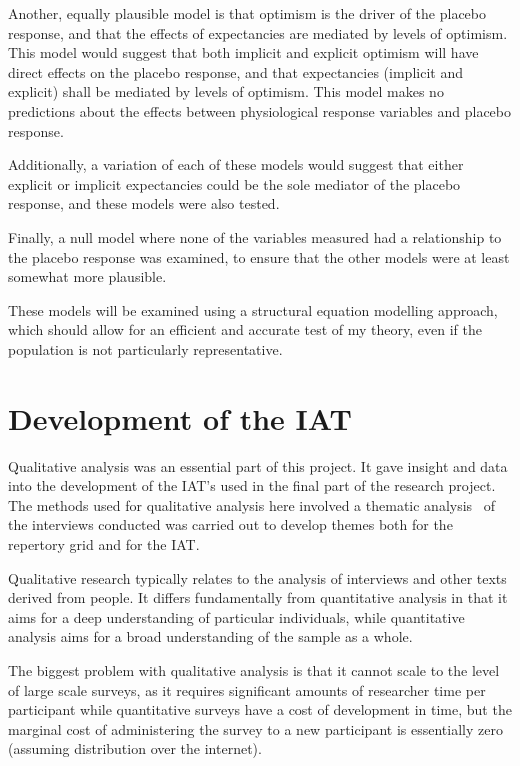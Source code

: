 Another, equally plausible model is that optimism is the driver of the placebo response, and that the effects of expectancies are mediated by levels of optimism. This model would suggest that both implicit and explicit optimism will have direct effects on the placebo response, and that expectancies (implicit and explicit) shall be mediated by levels of optimism. This model makes no predictions about the effects between physiological response variables and placebo response. 

Additionally, a variation of each of these models would suggest that either explicit or implicit expectancies could be the sole mediator of the placebo response, and these models were also tested. 

Finally, a null model where none of the variables measured had a relationship to the placebo response was examined, to ensure that the other models were at least somewhat more plausible. 

These models will be examined using a structural equation modelling approach, which should allow for an efficient and accurate test of my theory, even if the population is not particularly representative. 


\section{Development of the IAT}

Qualitative analysis was an essential part of this project.  
It gave insight and data into the development of the IAT's used in the final part of the research project.
The methods used for qualitative analysis here involved a thematic analysis~\cite{braun2006using} of the interviews conducted was carried out to develop themes both for the repertory grid and for the IAT.

Qualitative research typically relates to the analysis of interviews and other texts derived from people. It differs fundamentally from quantitative analysis in that it aims for a deep understanding of particular individuals, while quantitative analysis aims for a broad understanding of the sample as a whole. 

The biggest problem with qualitative analysis is that it cannot scale to the level of large scale surveys, as it requires significant amounts of researcher time per participant while quantitative surveys have a cost of development in time, but the marginal cost of administering the survey to a new participant is essentially zero (assuming distribution over the internet).


